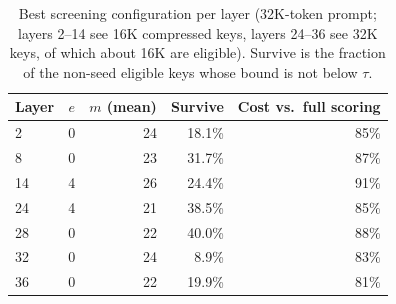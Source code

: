 \begin{table}[h]
\centering
\small
\caption{Best screening configuration per layer (32K-token prompt; layers 2--14 see 16K compressed keys, layers 24--36 see 32K keys, of which about 16K are eligible). Survive is the fraction of the non-seed eligible keys whose bound is not below $\tau$.}
\label{tab:dosa}
\begin{tabular}{@{}lrrrr@{}}
\toprule
Layer & $e$ & $m$ (mean) & Survive & Cost vs.\ full scoring \\
\midrule
2 & 0 & 24 & 18.1\% & 85\% \\
8 & 0 & 23 & 31.7\% & 87\% \\
14 & 4 & 26 & 24.4\% & 91\% \\
24 & 4 & 21 & 38.5\% & 85\% \\
28 & 0 & 22 & 40.0\% & 88\% \\
32 & 0 & 24 & 8.9\% & 83\% \\
36 & 0 & 22 & 19.9\% & 81\% \\
\bottomrule
\end{tabular}
\end{table}
